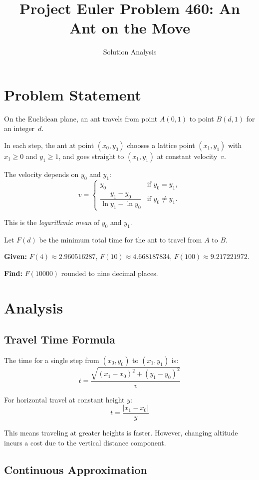 \documentclass[11pt]{article}
\title{Project Euler Problem 460: An Ant on the Move}
\author{Solution Analysis}
\date{}
\begin{document}
\maketitle

\section{Problem Statement}

On the Euclidean plane, an ant travels from point $A(0, 1)$ to point $B(d, 1)$
for an integer~$d$.

In each step, the ant at point $(x_0, y_0)$ chooses a lattice point $(x_1, y_1)$
with $x_1 \geq 0$ and $y_1 \geq 1$, and goes straight to $(x_1, y_1)$ at
constant velocity~$v$.

The velocity depends on $y_0$ and $y_1$:
\[
v = \begin{cases}
y_0 & \text{if } y_0 = y_1, \\[4pt]
\dfrac{y_1 - y_0}{\ln y_1 - \ln y_0} & \text{if } y_0 \neq y_1.
\end{cases}
\]

This is the \emph{logarithmic mean} of $y_0$ and $y_1$.

Let $F(d)$ be the minimum total time for the ant to travel from $A$ to $B$.

\textbf{Given:} $F(4) \approx 2.960516287$, $F(10) \approx 4.668187834$,
$F(100) \approx 9.217221972$.

\textbf{Find:} $F(10000)$ rounded to nine decimal places.

\section{Analysis}

\subsection{Travel Time Formula}

The time for a single step from $(x_0, y_0)$ to $(x_1, y_1)$ is:
\[
t = \frac{\sqrt{(x_1 - x_0)^2 + (y_1 - y_0)^2}}{v}
\]

For horizontal travel at constant height $y$:
\[
t = \frac{|x_1 - x_0|}{y}
\]

This means traveling at greater heights is faster. However, changing altitude
incurs a cost due to the vertical distance component.

\subsection{Continuous Approximation}
\end{document}
